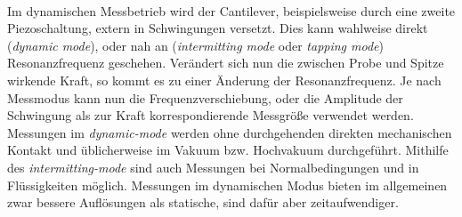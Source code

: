 \\
Im dynamischen Messbetrieb wird der Cantilever, beispielsweise durch eine zweite Piezoschaltung, extern in Schwingungen versetzt. Dies kann wahlweise direkt (\textit{dynamic mode}), oder nah an (\textit{intermitting mode} oder \textit{tapping mode}) Resonanzfrequenz geschehen. Verändert sich nun die zwischen Probe und Spitze wirkende Kraft, so kommt es zu einer Änderung der Resonanzfrequenz. Je nach Messmodus kann nun die Frequenzverschiebung, oder die Amplitude der Schwingung als zur Kraft korrespondierende Messgröße verwendet werden. Messungen im \textit{dynamic-mode} werden ohne durchgehenden direkten mechanischen Kontakt und üblicherweise im Vakuum bzw. Hochvakuum durchgeführt. Mithilfe des \textit{intermitting-mode} sind auch Messungen bei Normalbedingungen und in Flüssigkeiten möglich.
Messungen im dynamischen Modus bieten im allgemeinen zwar bessere Auflösungen als statische, sind dafür aber zeitaufwendiger.

